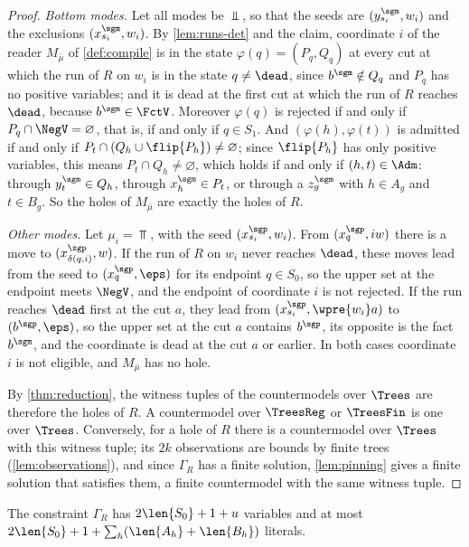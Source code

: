 \begin{proof}
\emph{Bottom modes.} Let all modes be $\Bot$, so that the seeds are
$(y_{s_i}^{\sgm},w_i)$ and the exclusions $(x_{s_i}^{\sgm},w_i)$. By
\cref{lem:runs-det} and the claim, coordinate $i$ of the reader
$M_{\bar\mu}$ of \cref{def:compile} is in the state
$\varphi(q)=(P_q,Q_q)$ at every cut at which the run of $R$ on $w_i$ is in
the state $q\ne\dead$, since $b^{\sgm}\notin Q_q$ and $P_q$ has no positive
variables; and it is dead at the first cut at which the run of $R$ reaches
$\dead$, because $b^{\sgm}\in\FctV$. Moreover $\varphi(q)$ is rejected if
and only if $P_q\cap\NegV=\varnothing$, that is, if and only if $q\in S_1$.
And $(\varphi(h),\varphi(t))$ is admitted if and only if $P_t\cap(Q_h\cup
\flip{P_h})\ne\varnothing$; since $\flip{P_h}$ has only positive variables,
this means $P_t\cap Q_h\ne\varnothing$, which holds if and only if
$(h,t)\in\Adm$: through $y_t^{\sgm}\in Q_h$, through $x_h^{\sgm}\in P_t$, or
through a $z_g^{\sgm}$ with $h\in A_g$ and $t\in B_g$. So the holes of
$M_{\bar\mu}$ are exactly the holes of $R$.

\emph{Other modes.} Let $\mu_i=\Top$, with the seed $(x_{s_i}^{\sgp},w_i)$.
From $(x_q^{\sgp},iw)$ there is a move to $(x_{\delta(q,i)}^{\sgp},w)$. If the
run of $R$ on $w_i$ never reaches $\dead$, these moves lead from the seed to
$(x_q^{\sgp},\eps)$ for its endpoint $q\in S_0$, so the upper set at the
endpoint meets $\NegV$, and the endpoint of coordinate $i$ is not rejected.
If the run reaches $\dead$ first at the cut $a$, they lead from
$(x_{s_i}^{\sgp},\wpre{w_i}a)$ to $(b^{\sgp},\eps)$, so the upper set at the
cut $a$ contains $b^{\sgp}$, its opposite is the fact $b^{\sgm}$, and the
coordinate is dead at the cut $a$ or earlier. In both cases coordinate $i$
is not eligible, and $M_{\bar\mu}$ has no hole.

By \cref{thm:reduction}, the witness tuples of the countermodels over
$\Trees$ are therefore the holes of $R$. A countermodel over $\TreesReg$ or
$\TreesFin$ is one over $\Trees$. Conversely, for a hole of $R$ there is a
countermodel over $\Trees$ with this witness tuple; its $2k$ observations are
bounds by finite trees (\cref{lem:observations}), and since $\Gamma_R$ has a
finite solution, \cref{lem:pinning} gives a finite solution that satisfies
them, a finite countermodel with the same witness tuple.
\end{proof}

The constraint $\Gamma_R$ has $2\len{S_0}+1+u$ variables and at most
$2\len{S_0}+1+\sum_h(\len{A_h}+\len{B_h})$ literals.

